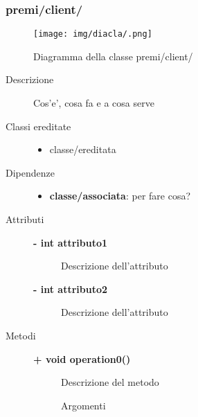 \subsubsection{premi/client/}
\begin{figure}[h]
\begin{center}
\texttt{[image: img/diacla/.png]}
\caption{Diagramma della classe premi/client/}
\end{center}
\end{figure}


\begin{description}
\item[Descrizione] \hfill
	Cos'e', cosa fa e a cosa serve
	
	
\item[Classi ereditate] \hfill
	\begin{itemize}
		\item classe/ereditata
	\end{itemize}
	
	
\item[Dipendenze] \hfill
	\begin{itemize}
		\item \textbf{classe/associata}: per fare cosa?
	\end{itemize}
	
	
\item[Attributi] \hfill
	\begin{description}
		\item[\textbf{- int attributo1			}] \hfill
			Descrizione dell'attributo
		\item[\textbf{- int attributo2			}] \hfill
			Descrizione dell'attributo
	\end{description}
	
	
\item[Metodi] \hfill

	\begin{description}
		\item[\textbf{\color{blue}+ void operation0()			}] \hfill
			Descrizione del metodo
			
		\begin{description}
			\item[Argomenti] \hfill
				\begin{itemize}
				

\end{itemize}
\end{description}
\end{description}
\end{description}
